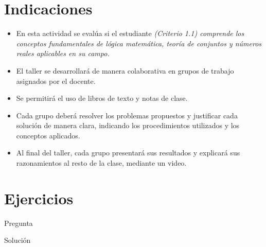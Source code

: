 \documentclass[11pt,a4]{aleph-examen}
\begin{document}
\encabezado

\section*{Indicaciones}
\begin{itemize}[leftmargin=*]
\item 
    En esta actividad se evalúa si el estudiante \textit{(Criterio 1.1) comprende los conceptos fundamentales de lógica matemática, teoría de conjuntos y números reales aplicables en su campo.}
\item 
    El taller se desarrollará de manera colaborativa en grupos de trabajo asignados por el docente.
\item 
    Se permitirá el uso de libros de texto y notas de clase.
\item 
    Cada grupo deberá resolver los problemas propuestos y justificar cada solución de manera clara, indicando los procedimientos utilizados y los conceptos aplicados.
\item 
    Al final del taller, cada grupo presentará sus resultados y explicará sus razonamientos al resto de la clase, mediante un video.
\end{itemize}


\section*{Ejercicios}

\begin{preguntas}

\item
    Pregunta

\begin{respuesta}
    Solución
\end{respuesta}


\end{preguntas}
\end{document}
